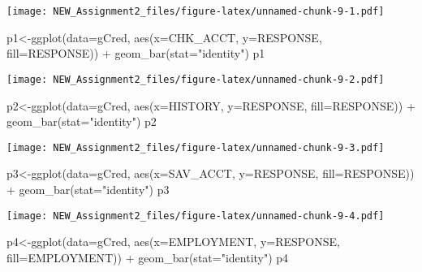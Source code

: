 \documentclass[
]{article}
\newenvironment{Shaded}{\begin{snugshade}}{\end{snugshade}}
\newcommand{\AttributeTok}[1]{\textcolor[rgb]{0.77,0.63,0.00}{#1}}
\newcommand{\FunctionTok}[1]{\textcolor[rgb]{0.00,0.00,0.00}{#1}}
\newcommand{\NormalTok}[1]{#1}
\newcommand{\OtherTok}[1]{\textcolor[rgb]{0.56,0.35,0.01}{#1}}
\newcommand{\SpecialCharTok}[1]{\textcolor[rgb]{0.00,0.00,0.00}{#1}}
\newcommand{\StringTok}[1]{\textcolor[rgb]{0.31,0.60,0.02}{#1}}
\begin{document}
\texttt{[image: NEW\_Assignment2\_files/figure-latex/unnamed-chunk-9-1.pdf]}

\begin{Shaded}
\begin{Highlighting}[]
\NormalTok{p1}\OtherTok{\textless{}{-}}\FunctionTok{ggplot}\NormalTok{(}\AttributeTok{data=}\NormalTok{gCred, }\FunctionTok{aes}\NormalTok{(}\AttributeTok{x=}\NormalTok{CHK\_ACCT, }\AttributeTok{y=}\NormalTok{RESPONSE, }\AttributeTok{fill=}\NormalTok{RESPONSE)) }\SpecialCharTok{+}
          \FunctionTok{geom\_bar}\NormalTok{(}\AttributeTok{stat=}\StringTok{"identity"}\NormalTok{)}
\NormalTok{p1}
\end{Highlighting}
\end{Shaded}

\texttt{[image: NEW\_Assignment2\_files/figure-latex/unnamed-chunk-9-2.pdf]}

\begin{Shaded}
\begin{Highlighting}[]
\NormalTok{p2}\OtherTok{\textless{}{-}}\FunctionTok{ggplot}\NormalTok{(}\AttributeTok{data=}\NormalTok{gCred, }\FunctionTok{aes}\NormalTok{(}\AttributeTok{x=}\NormalTok{HISTORY, }\AttributeTok{y=}\NormalTok{RESPONSE, }\AttributeTok{fill=}\NormalTok{RESPONSE)) }\SpecialCharTok{+}
          \FunctionTok{geom\_bar}\NormalTok{(}\AttributeTok{stat=}\StringTok{"identity"}\NormalTok{)}
\NormalTok{p2}
\end{Highlighting}
\end{Shaded}

\texttt{[image: NEW\_Assignment2\_files/figure-latex/unnamed-chunk-9-3.pdf]}

\begin{Shaded}
\begin{Highlighting}[]
\NormalTok{p3}\OtherTok{\textless{}{-}}\FunctionTok{ggplot}\NormalTok{(}\AttributeTok{data=}\NormalTok{gCred, }\FunctionTok{aes}\NormalTok{(}\AttributeTok{x=}\NormalTok{SAV\_ACCT, }\AttributeTok{y=}\NormalTok{RESPONSE, }\AttributeTok{fill=}\NormalTok{RESPONSE)) }\SpecialCharTok{+}
          \FunctionTok{geom\_bar}\NormalTok{(}\AttributeTok{stat=}\StringTok{"identity"}\NormalTok{)}
\NormalTok{p3}
\end{Highlighting}
\end{Shaded}

\texttt{[image: NEW\_Assignment2\_files/figure-latex/unnamed-chunk-9-4.pdf]}

\begin{Shaded}
\begin{Highlighting}[]
\NormalTok{p4}\OtherTok{\textless{}{-}}\FunctionTok{ggplot}\NormalTok{(}\AttributeTok{data=}\NormalTok{gCred, }\FunctionTok{aes}\NormalTok{(}\AttributeTok{x=}\NormalTok{EMPLOYMENT, }\AttributeTok{y=}\NormalTok{RESPONSE, }\AttributeTok{fill=}\NormalTok{EMPLOYMENT)) }\SpecialCharTok{+}
          \FunctionTok{geom\_bar}\NormalTok{(}\AttributeTok{stat=}\StringTok{"identity"}\NormalTok{)}
\NormalTok{p4}
\end{Highlighting}
\end{Shaded}
\end{document}
